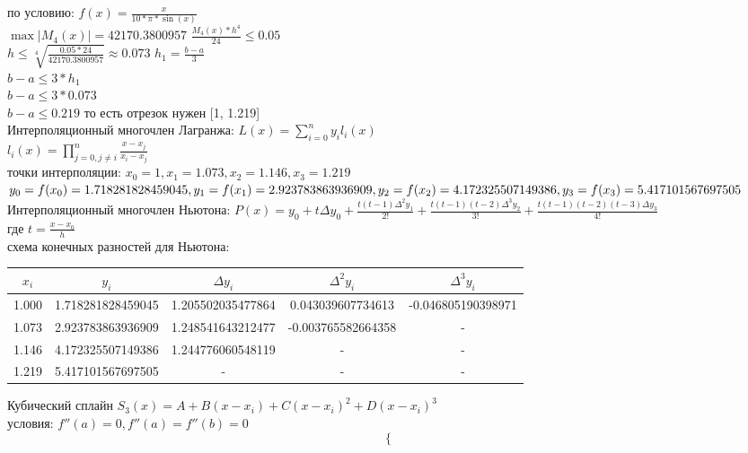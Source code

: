 \documentclass[12pt]{article}
\begin{document}
    по условию: $f(x) = \frac{x}{10*\pi*\sin(x)}$\\
    $\max|M_{4}(x)| = 42170.3800957$
    $\frac{M_4(x)*h^4}{24} \le 0.05$
    \\
    $h \le \sqrt[4]{\frac{0.05*24}{42170.3800957}} \approx 0.073$
    $h_1 = \frac{b - a}{3}$\\
    $b - a \le 3 * h_1$\\
    $b - a \le 3 * 0.073$\\
    $b - a \le 0.219$
    то есть отрезок нужен [1, 1.219]\\
    Интерполяционный многочлен Лагранжа:
    $L(x) = \sum_{i=0}^{n} y_i l_i(x)$\\
    $l_i(x) = \prod_{j=0, j \neq i}^{n} \frac{x - x_j}{x_i - x_j}$\\
    точки интерполяции: $x_0 = 1, x_1 = 1.073, x_2 = 1.146, x_3 = 1.219$\\
    $y_0 = f(x_0) = 1.718281828459045, y_1 = f(x_1) = 2.923783863936909, \\
    y_2 = f(x_2) = 4.172325507149386, y_3 = f(x_3) = 5.417101567697505$\\
    Интерполяционный многочлен Ньютона: $P(x) = y_0 + t\Delta y_0 + \frac{t(t-1)\Delta^2 y_1}{2!} + \frac{t(t-1)(t-2)\Delta^3 y_2}{3!} + \frac{t(t-1)(t-2)(t-3)\Delta y_3}{4!}$\\
    где $t = \frac{x - x_0}{h}$\\
    схема конечных разностей для Ньютона:\\
    \begin{tabular}{c|c|c|c|c}
    $x_i$ & $y_i$ & $\Delta y_i$ & $\Delta^2 y_i$ & $\Delta^3 y_i$ \\
        \hline
        1.000 & 1.718281828459045 & 1.205502035477864 & 0.043039607734613 & -0.046805190398971 \\
        1.073 & 2.923783863936909 & 1.248541643212477 &-0.003765582664358 &-\\
        1.146 & 4.172325507149386 & 1.244776060548119 &-&-\\
        1.219 & 5.417101567697505 &-&-&-\\
    \end{tabular}

    Кубический сплайн $S_3(x) = A + B(x - x_i) + C(x - x_i)^2 + D(x - x_i)^3$\\
    условия: $f''(a) = 0 , f''(a) = f''(b) = 0 $
    \[
    \begin{cases}
        
    \end{cases}
    \]
\end{document}
